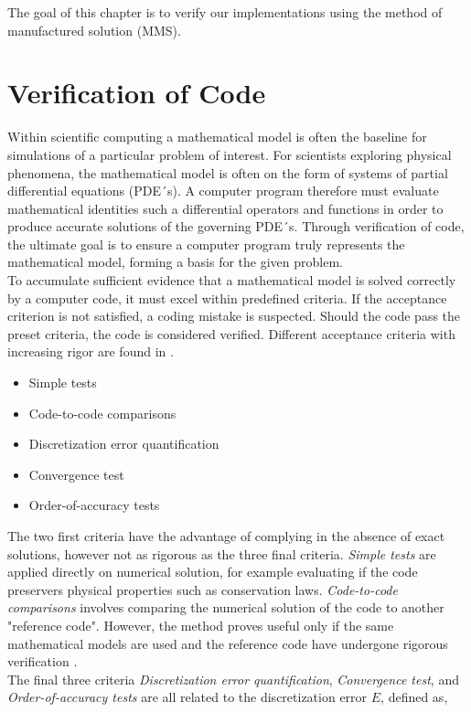 The goal of this chapter is to verify our implementations using the method of manufactured solution  (MMS).

\section{Verification of Code}
Within scientific computing a mathematical model is often the baseline for simulations of a particular problem of interest. For scientists exploring physical phenomena, the mathematical model is often on the form of systems of partial differential equations (PDE´s). A computer program therefore must evaluate  mathematical identities such a differential operators and functions in order to produce accurate solutions of the governing PDE´s. 
Through verification of code, the ultimate goal is to ensure a computer program truly represents the mathematical model, forming a basis for the given problem. \\
To accumulate sufficient evidence that a mathematical model is solved correctly by a computer code,  it must excel within predefined criteria. If the acceptance criterion is not satisfied, a coding mistake is suspected. Should the code pass the preset criteria, the code is considered verified. Different acceptance criteria with increasing rigor are found in \cite{Roache}.

\begin{itemize}
\item Simple tests
\item Code-to-code comparisons
\item Discretization error quantification
\item Convergence test
\item Order-of-accuracy tests
\end{itemize} 

The two first criteria have the advantage of complying  in the absence of exact solutions, however not as rigorous as the three final criteria. \textit{Simple tests} are applied directly on numerical solution, for example evaluating if the code preservers physical properties such as conservation laws. \textit{Code-to-code comparisons} involves comparing the numerical solution of the code to another "reference code".  However, the method proves useful only  if the same mathematical models are used and the reference code have undergone rigorous verification \cite{Roache}. \\
The final three criteria \textit{Discretization error quantification}, \textit{Convergence test}, and \textit{Order-of-accuracy tests} are all related to the discretization error  $E$, defined as,

